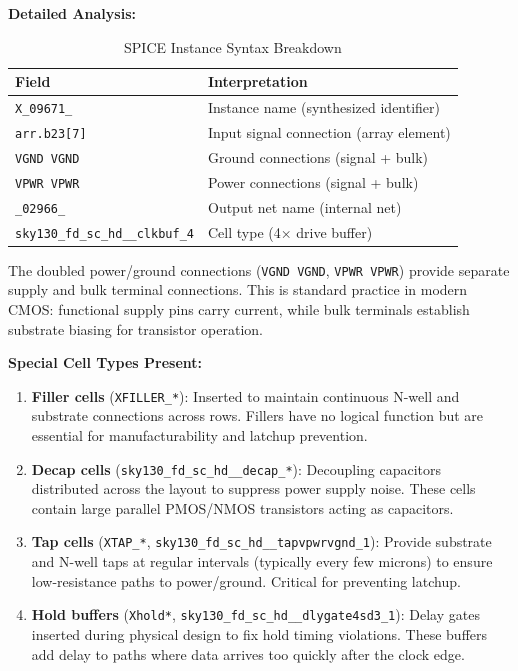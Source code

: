 \documentclass[12pt,a4paper]{article}
\begin{document}
\textbf{Detailed Analysis:}

\begin{table}[H]
\centering
\caption{SPICE Instance Syntax Breakdown}
\label{tab:spice_instance}
\begin{tabular}{@{}ll@{}}
\toprule
\textbf{Field} & \textbf{Interpretation} \\
\midrule
\texttt{X\_09671\_} & Instance name (synthesized identifier) \\
\texttt{arr.b23[7]} & Input signal connection (array element) \\
\texttt{VGND VGND} & Ground connections (signal + bulk) \\
\texttt{VPWR VPWR} & Power connections (signal + bulk) \\
\texttt{\_02966\_} & Output net name (internal net) \\
\texttt{sky130\_fd\_sc\_hd\_\_clkbuf\_4} & Cell type (4× drive buffer) \\
\bottomrule
\end{tabular}
\end{table}

The doubled power/ground connections (\texttt{VGND VGND}, \texttt{VPWR VPWR}) provide separate supply and bulk terminal connections. This is standard practice in modern CMOS: functional supply pins carry current, while bulk terminals establish substrate biasing for transistor operation.

\textbf{Special Cell Types Present:}

\begin{enumerate}
    \item \textbf{Filler cells} (\texttt{XFILLER\_*}): Inserted to maintain continuous N-well and substrate connections across rows. Fillers have no logical function but are essential for manufacturability and latchup prevention.
    
    \item \textbf{Decap cells} (\texttt{sky130\_fd\_sc\_hd\_\_decap\_*}): Decoupling capacitors distributed across the layout to suppress power supply noise. These cells contain large parallel PMOS/NMOS transistors acting as capacitors.
    
    \item \textbf{Tap cells} (\texttt{XTAP\_*}, \texttt{sky130\_fd\_sc\_hd\_\_tapvpwrvgnd\_1}): Provide substrate and N-well taps at regular intervals (typically every few microns) to ensure low-resistance paths to power/ground. Critical for preventing latchup.
    
    \item \textbf{Hold buffers} (\texttt{Xhold*}, \texttt{sky130\_fd\_sc\_hd\_\_dlygate4sd3\_1}): Delay gates inserted during physical design to fix hold timing violations. These buffers add delay to paths where data arrives too quickly after the clock edge.
\end{enumerate}
\end{document}
